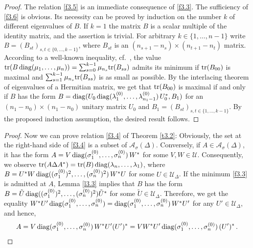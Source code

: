 \documentclass{amsart}
\begin{document}
\begin{proof}
The relation \eqref{f3.5} is an immediate consequence of \eqref{f3.3}. The sufficiency of \ref{f3.6} is obvious. Its necessity can be proved by induction on the number $k$ of different eigenvalues of $B$. If $k=1$ the matrix $B$ is a scalar multiple of the identity matrix, and the assertion is trivial. For arbitrary $k \in \{1,\ldots,n-1\}$ write $B=(B_{st})_{s,t \in \{ 0,\ldots,k-1\}}$, where $B_{st}$ is an $(n_{s+1}-n_s) \times (n_{t+1}-n_t)$ matrix. According to a well-known inequality, cf.~\cite[Prop.~6.A.3]{MOA}, the value ${\rm tr}(B \, {\rm diag}(\mu_1, \ldots , \mu_n)) = \sum_{s=0}^{k-1} \mu_{n_s} {\rm tr}(B_{ss})$ admits its minimum if ${\rm tr}(B_{00})$ is maximal and $\sum_{s=1}^{k-1} \mu_{n_s} {\rm tr}(B_{ss})$ is as small as possible. By the interlacing theorem of eigenvalues of a Hermitian matrix, we get that  ${\rm tr}(B_{00})$ is maximal if and only if $B$ has the form $B={\rm diag}(U_0 \, {\rm diag}(\lambda_1^{(0)}, \ldots , \lambda_{{n_1}-1}^{(0)}) \, U_0^*, B_1)$ for an $(n_1-n_0) \times (n_1-n_0)$ unitary matrix $U_0$ and $B_1= (B_{st})_{s,t \in \{ 1, \ldots, k-1\}}$. By the proposed induction assumption, the desired result follows. 
\end{proof}

\begin{proof}
Now we can prove relation \eqref{f3.4} of Theorem \ref{t3.2}: Obviously, the set at the right-hand side of \eqref{f3.4} is a subset of ${\mathcal A}_\sigma(\Delta)$. Conversely, if $A \in {\mathcal A}_\sigma (\Delta)$, it has the form $A=V \, {\rm diag}(\sigma_1^{(0)}, \ldots , \sigma_n^{(0)}) \, W^*$ for some $V,W \in \mathcal U$. Consequently, we observe ${\rm tr}(A \Delta A^*) = {\rm tr}(B) \, {\rm diag}(\lambda_n, \ldots , \lambda_1)$, where $B = U^*W \, {\rm diag}((\sigma_1^{(0)})^2, \ldots , (\sigma_n^{(0)})^2) \, W^*U$ for some $U \in {\mathcal U}_\Delta$. If the minimum \eqref{f3.3} is admitted at $A$, Lemma \ref{l3.3} implies that $B$ has the form $B= \tilde{U} \, {\rm diag}((\sigma_1^{(0)})^2, \ldots , (\sigma_n^{(0)})^2) \tilde{U}^*$ for some $\tilde{U} \in {\mathcal U}_\Delta$. Therefore, we get the equality 
$W^* U' \, {\rm diag}(\sigma_1^{(0)}, \ldots , \sigma_n^{(0)}) = {\rm diag}(\sigma_1^{(0)}, \ldots , \sigma_n^{(0)}) \, W^*U'$ for any $U' \in {\mathcal U}_\Delta$, and hence, 
\[
A=V \, {\rm diag}(\sigma_1^{(0)}, \ldots , \sigma_n^{(0)}) \, W^* U' (U')^* = V W^* U' \, {\rm diag}(\sigma_1^{(0)}, \ldots , \sigma_n^{(0)})  \, (U')^* \, . 
\]
\end{proof}
\end{document}

